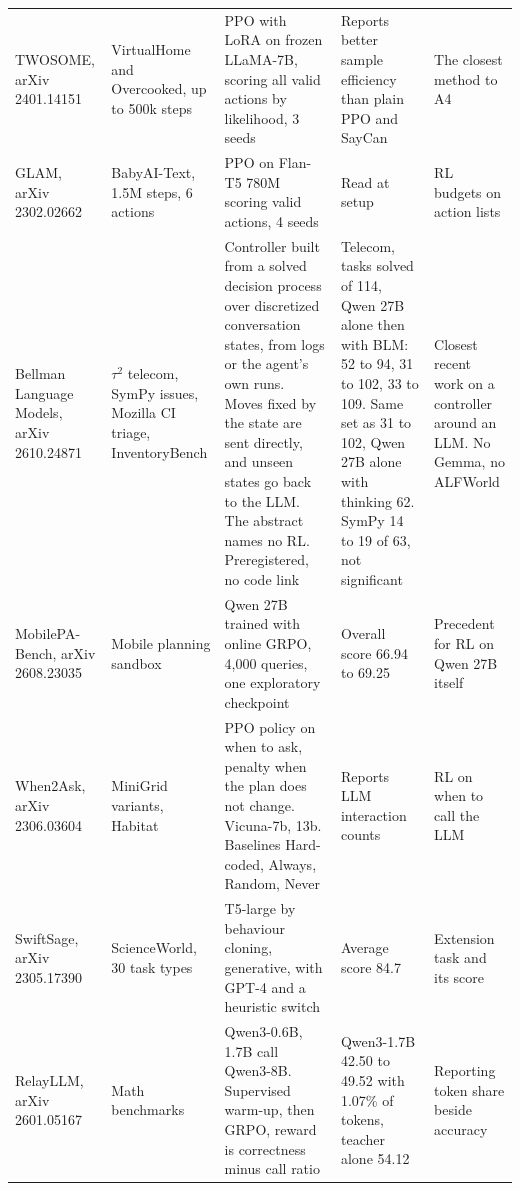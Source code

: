 \documentclass[10pt]{article}
\begin{document}
\begin{table}[H]
\begin{tabularx}{\linewidth}{@{}P{2.3cm} P{4.1cm} P{4.3cm} L P{4.6cm}@{}}
TWOSOME, arXiv 2401.14151 & VirtualHome and Overcooked, up to 500k steps & PPO with LoRA on frozen LLaMA-7B, scoring all valid actions by likelihood, 3 seeds & Reports better sample efficiency than plain PPO and SayCan & The closest method to A4 \\
GLAM, arXiv 2302.02662 & BabyAI-Text, 1.5M steps, 6 actions & PPO on Flan-T5 780M scoring valid actions, 4 seeds & Read at setup & RL budgets on action lists \\
Bellman Language Models, arXiv 2610.24871 & $\tau^2$ telecom, SymPy issues, Mozilla CI triage, InventoryBench & Controller built from a solved decision process over discretized conversation states, from logs or the agent's own runs. Moves fixed by the state are sent directly, and unseen states go back to the LLM. The abstract names no RL. Preregistered, no code link & Telecom, tasks solved of 114, Qwen 27B alone then with BLM: 52 to 94, 31 to 102, 33 to 109. Same set as 31 to 102, Qwen 27B alone with thinking 62. SymPy 14 to 19 of 63, not significant & Closest recent work on a controller around an LLM. No Gemma, no ALFWorld \\
MobilePA-Bench, arXiv 2608.23035 & Mobile planning sandbox & Qwen 27B trained with online GRPO, 4,000 queries, one exploratory checkpoint & Overall score 66.94 to 69.25 & Precedent for RL on Qwen 27B itself \\
When2Ask, arXiv 2306.03604 & MiniGrid variants, Habitat & PPO policy on when to ask, penalty when the plan does not change. Vicuna-7b, 13b. Baselines Hard-coded, Always, Random, Never & Reports LLM interaction counts & RL on when to call the LLM \\
SwiftSage, arXiv 2305.17390 & ScienceWorld, 30 task types & T5-large by behaviour cloning, generative, with GPT-4 and a heuristic switch & Average score 84.7 & Extension task and its score \\
RelayLLM, arXiv 2601.05167 & Math benchmarks & Qwen3-0.6B, 1.7B call Qwen3-8B. Supervised warm-up, then GRPO, reward is correctness minus call ratio & Qwen3-1.7B 42.50 to 49.52 with 1.07\% of tokens, teacher alone 54.12 & Reporting token share beside accuracy \\
\bottomrule
\end{tabularx}
\end{table}
\end{document}
